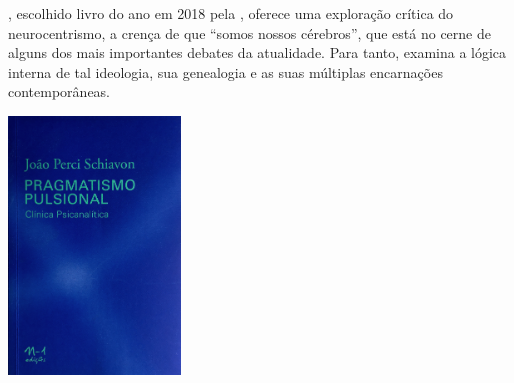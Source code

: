 \medskip

, escolhido livro do ano em 2018 pela {}, oferece uma exploração crítica do neurocentrismo, a crença de que “somos nossos cérebros”, que está no cerne de alguns dos mais importantes debates da atualidade. Para tanto, examina a lógica interna de tal ideologia, sua genealogia e as suas múltiplas encarnações contemporâneas.

\vfill

\hspace*{-.4cm}\begin{minipage}[c]{1\linewidth}
\small{
{}}
\end{minipage}

\pagebreak

\hspace{.5cm}

\begin{center}
\hspace*{-.5cm}\includegraphics[width=45.8mm]{./imgs/gozo.png}
\end{center}

\hspace*{-7cm}\hrulefill\hspace*{-7cm}

\medskip

